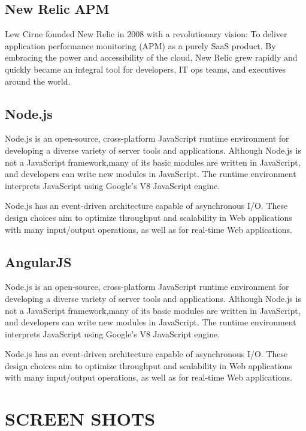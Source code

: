 \documentclass[12pt,a4paper,oneside]{report}
\begin{document}
{\subsection{New Relic APM}
\par
Lew Cirne founded New Relic in 2008 with a revolutionary vision: To deliver application performance monitoring (APM) as a purely SaaS product. By embracing the power and accessibility of the cloud, New Relic grew rapidly and quickly became an integral tool for developers, IT ops teams, and executives around the world.

\subsection{Node.js}
\par
Node.js is an open-source, cross-platform JavaScript runtime environment for developing a diverse variety of server tools and applications. Although Node.js is not a JavaScript framework,many of its basic modules are written in JavaScript, and developers can write new modules in JavaScript. The runtime environment interprets JavaScript using Google's V8 JavaScript engine.

Node.js has an event-driven architecture capable of asynchronous I/O. These design choices aim to optimize throughput and scalability in Web applications with many input/output operations, as well as for real-time Web applications.

\subsection{AngularJS}
\par
Node.js is an open-source, cross-platform JavaScript runtime environment for developing a diverse variety of server tools and applications. Although Node.js is not a JavaScript framework,many of its basic modules are written in JavaScript, and developers can write new modules in JavaScript. The runtime environment interprets JavaScript using Google's V8 JavaScript engine.

Node.js has an event-driven architecture capable of asynchronous I/O. These design choices aim to optimize throughput and scalability in Web applications with many input/output operations, as well as for real-time Web applications.
\pagebreak
\section{SCREEN SHOTS}
}
\end{document}
